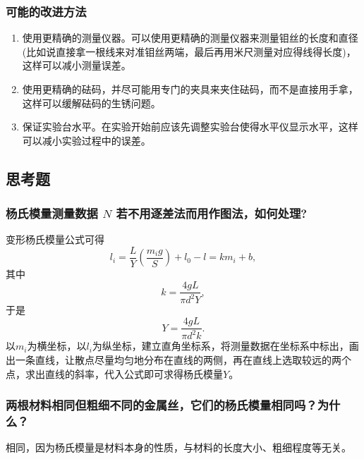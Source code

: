 \documentclass[zihao=5, UTF8]{article}
\theoremstyle{MyLineTheoremStyle} %
\theoremstyle{MyBlockTheoremStyle} %
\theoremstyle{MySubsubsectionStyle} %
\begin{document}
\subsubsection{可能的改进方法}
\begin{enumerate}
    \item 使用更精确的测量仪器。可以使用更精确的测量仪器来测量钼丝的长度和直径(比如说直接拿一根线来对准钼丝两端，最后再用米尺测量对应得线得长度)，这样可以减小测量误差。
    \item 使用更精确的砝码，并尽可能用专门的夹具来夹住砝码，而不是直接用手拿，这样可以缓解砝码的生锈问题。
    \item 保证实验台水平。在实验开始前应该先调整实验台使得水平仪显示水平，这样可以减小实验过程中的误差。
\end{enumerate}

\subsection{思考题}
\subsubsection{杨氏模量测量数据 $N$ 若不用逐差法而用作图法，如何处理?}
变形杨氏模量公式可得
\[
l_i = \frac{L}{Y}\left(\frac{m_i g}{S}\right) + l_0 - l = km_i + b,
\]
其中
\[
k = \frac{4gL}{\pi d^2 Y},
\]
于是
\[
Y = \frac{4gL}{\pi d^2 k}.
\]
以$m_i$为横坐标，以$l_i$为纵坐标，建立直角坐标系，将测量数据在坐标系中标出，画出一条直线，让散点尽量均匀地分布在直线的两侧，再在直线上选取较远的两个点，求出直线的斜率，代入公式即可求得杨氏模量$Y$。

\subsubsection{两根材料相同但粗细不同的金属丝，它们的杨氏模量相同吗？为什么？}
相同，因为杨氏模量是材料本身的性质，与材料的长度大小、粗细程度等无关。
\end{document}

